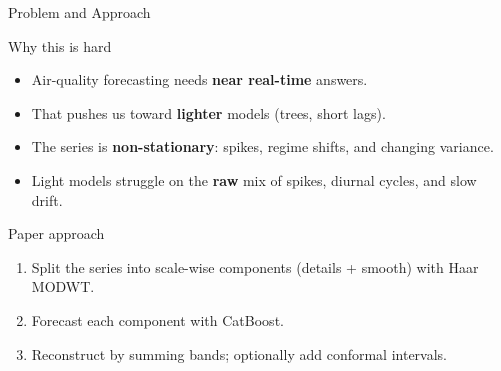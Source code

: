 \begin{frame}{Problem and Approach}
  \begin{block}{Why this is hard}
    \begin{itemize}
      \item Air-quality forecasting needs \textbf{near real-time} answers.
      \item That pushes us toward \textbf{lighter} models (trees, short lags).
      \item The series is \textbf{non-stationary}: spikes, regime shifts, and changing variance.
      \item Light models struggle on the \textbf{raw} mix of spikes, diurnal cycles, and slow drift.
    \end{itemize}
  \end{block}

  \begin{exampleblock}{Paper approach}
    \begin{enumerate}
      \item Split the series into scale-wise components (details + smooth) with Haar MODWT.
      \item Forecast each component with CatBoost.
      \item Reconstruct by summing bands; optionally add conformal intervals.
    \end{enumerate}
  \end{exampleblock}
\end{frame}
